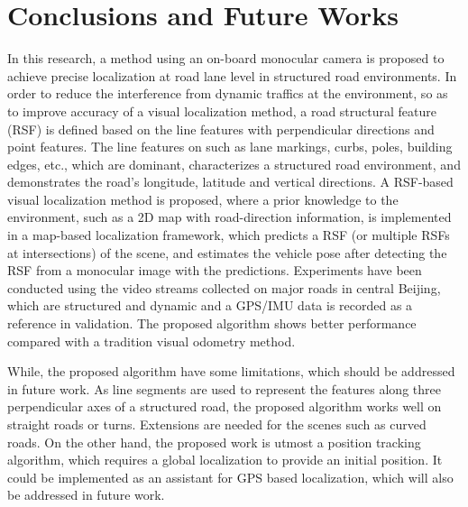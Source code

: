 \documentclass[letterpaper, 10 pt, conference]{ieeeconf}  %
\begin{document}
\section{Conclusions and Future Works}
In this research, a method using an on-board monocular camera is proposed to achieve precise localization at road lane level in structured road environments. In order to reduce the interference from dynamic traffics at the environment, so as to improve accuracy of a visual localization method, a road structural feature (RSF) is defined based on the line features with perpendicular directions and point features. The line features on such as lane markings, curbs, poles, building edges, etc., which are dominant, characterizes a structured road environment, and demonstrates the road's longitude, latitude and vertical directions.
A RSF-based visual localization method is proposed, where a prior knowledge to the environment, such as a 2D map with road-direction information, is implemented in a map-based localization framework, which predicts a RSF (or multiple RSFs at intersections) of the scene, and  estimates the vehicle pose after detecting the RSF from a monocular image with the predictions.
Experiments have been conducted using the video streams collected on major roads in central Beijing, which are structured and dynamic and a GPS/IMU data is recorded as a reference in validation.
The proposed algorithm shows better performance compared with a tradition visual odometry method.

While, the proposed algorithm have some limitations, which should be addressed in future work. As line segments are used to represent the features along three perpendicular axes of a structured road, the proposed algorithm works well on straight roads or turns. Extensions are needed for the scenes such as curved roads. On the other hand, the proposed work is utmost a position tracking algorithm, which requires a global localization to provide an initial position. It could be implemented as an assistant for GPS based localization, which will also be addressed in future work.



\end{document}
